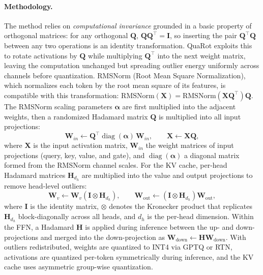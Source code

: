 \paragraph{Methodology.}
The method relies on \textit{computational invariance} grounded in a basic property of orthogonal matrices: for any orthogonal $\bm{Q}$, $\bm{Q}\bm{Q}^\top = \bm{I}$, so inserting the pair $\bm{Q}^\top\bm{Q}$ between any two operations is an identity transformation. QuaRot exploits this to rotate activations by $\bm{Q}$ while multiplying $\bm{Q}^\top$ into the next weight matrix, leaving the computation unchanged but spreading outlier energy uniformly across channels before quantization. RMSNorm (Root Mean Square Normalization), which normalizes each token by the root mean square of its features, is compatible with this transformation: $\text{RMSNorm}(\bm{X}) = \text{RMSNorm}(\bm{X}\bm{Q}^\top)\bm{Q}$. The RMSNorm scaling parameters $\bm{\alpha}$ are first multiplied into the adjacent weights, then a randomized Hadamard matrix $\bm{Q}$ is multiplied into all input projections:
\begin{equation}
  \bm{W}_{in} \leftarrow \bm{Q}^\top \operatorname{diag}(\bm{\alpha})\, \bm{W}_{in}, \qquad \bm{X} \leftarrow \bm{X}\bm{Q},
  \label{eq:quarot_rotate}
\end{equation}
where $\bm{X}$ is the input activation matrix, $\bm{W}_{in}$ the weight matrices of input projections (query, key, value, and gate), and $\operatorname{diag}(\bm{\alpha})$ a diagonal matrix formed from the RMSNorm channel scales.
For the KV cache, per-head Hadamard matrices $\bm{H}_{d_h}$ are multiplied into the value and output projections to remove head-level outliers:
\begin{equation}
  \bm{W}_v \leftarrow \bm{W}_v(\bm{I} \otimes \bm{H}_{d_h}), \qquad \bm{W}_{\text{out}} \leftarrow (\bm{I} \otimes \bm{H}_{d_h})\bm{W}_{\text{out}},
\end{equation}
where $\bm{I}$ is the identity matrix, $\otimes$ denotes the Kronecker product that replicates $\bm{H}_{d_h}$ block-diagonally across all heads, and $d_h$ is the per-head dimension.
Within the FFN, a Hadamard $\bm{H}$ is applied during inference between the up- and down-projections and merged into the down-projection as $\bm{W}_{\text{down}} \leftarrow \bm{H}\bm{W}_{\text{down}}$. With outliers redistributed, weights are quantized to INT4 via GPTQ or RTN, activations are quantized per-token symmetrically during inference, and the KV cache uses asymmetric group-wise quantization.

